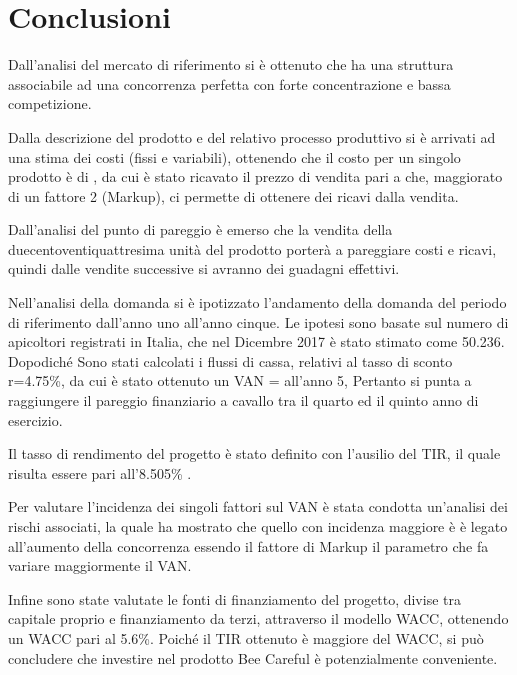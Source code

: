 \section{Conclusioni}
Dall’analisi del mercato di riferimento si è ottenuto che ha una struttura
associabile ad una concorrenza perfetta con forte concentrazione e bassa
competizione.

Dalla descrizione del prodotto e del relativo processo produttivo si è arrivati
ad una stima dei costi (fissi e variabili), ottenendo che il costo per un
singolo prodotto è di , da cui è stato ricavato il prezzo di
vendita pari a  che, maggiorato di un fattore 2 (Markup), ci
permette di ottenere dei ricavi dalla vendita.

Dall'analisi del punto di pareggio è emerso che la vendita della
duecentoventiquattresima unità del prodotto porterà a pareggiare costi e ricavi,
quindi dalle vendite successive si avranno dei guadagni effettivi.

Nell’analisi della domanda si è ipotizzato l’andamento della domanda del
periodo di riferimento dall’anno uno all’anno cinque. Le ipotesi sono basate sul
numero di apicoltori registrati in Italia, che nel Dicembre 2017 è stato stimato
come 50.236. Dopodiché Sono stati calcolati i flussi di cassa, relativi al tasso di sconto r=4.75\%, da
cui è stato ottenuto un VAN =  all’anno 5, Pertanto si punta a
raggiungere il pareggio finanziario a cavallo tra il quarto ed il quinto anno di
esercizio.

Il tasso di rendimento del progetto è stato definito con l’ausilio del TIR, il
quale risulta essere pari all'8.505\% .

Per valutare l’incidenza dei singoli fattori sul VAN è stata condotta un’analisi
dei rischi associati, la quale ha mostrato che quello con incidenza maggiore è
è legato all'aumento della concorrenza essendo il fattore di Markup il parametro
che fa variare maggiormente il VAN.

Infine sono state valutate le fonti di finanziamento del progetto, divise
tra capitale proprio e finanziamento da terzi, attraverso il modello WACC,
ottenendo un WACC pari al 5.6\%. Poiché il TIR ottenuto è maggiore del WACC,
si può concludere che investire nel prodotto Bee Careful è potenzialmente
conveniente.
